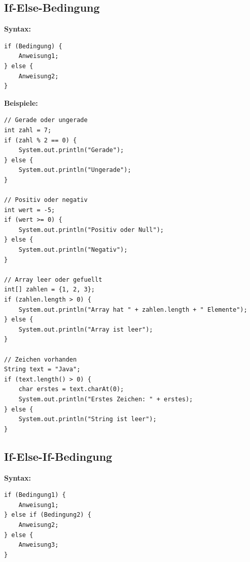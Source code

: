\newpage


\subsection*{If-Else-Bedingung}

\textbf{Syntax:}
\begin{lstlisting}
if (Bedingung) {
    Anweisung1;
} else {
    Anweisung2;
}
\end{lstlisting}

\textbf{Beispiele:}
\begin{lstlisting}
// Gerade oder ungerade
int zahl = 7;
if (zahl % 2 == 0) {
    System.out.println("Gerade");
} else {
    System.out.println("Ungerade");
}

// Positiv oder negativ
int wert = -5;
if (wert >= 0) {
    System.out.println("Positiv oder Null");
} else {
    System.out.println("Negativ");
}

// Array leer oder gefuellt
int[] zahlen = {1, 2, 3};
if (zahlen.length > 0) {
    System.out.println("Array hat " + zahlen.length + " Elemente");
} else {
    System.out.println("Array ist leer");
}

// Zeichen vorhanden
String text = "Java";
if (text.length() > 0) {
    char erstes = text.charAt(0);
    System.out.println("Erstes Zeichen: " + erstes);
} else {
    System.out.println("String ist leer");
}
\end{lstlisting}

\newpage


\subsection*{If-Else-If-Bedingung}

\textbf{Syntax:}
\begin{lstlisting}
if (Bedingung1) {
    Anweisung1;
} else if (Bedingung2) {
    Anweisung2;
} else {
    Anweisung3;
}
\end{lstlisting}

